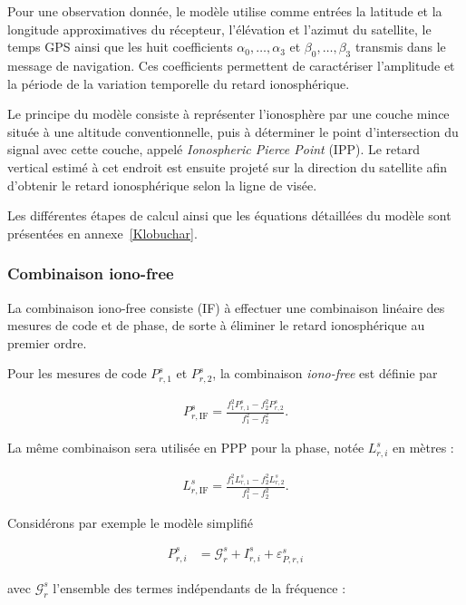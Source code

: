 Pour une observation donnée, le modèle utilise comme entrées la latitude et
la longitude approximatives du récepteur, l'élévation et l'azimut du
satellite, le temps GPS ainsi que les huit coefficients $\alpha_0,\ldots,
\alpha_3$ et $\beta_0,\ldots,\beta_3$ transmis dans le message de navigation.
Ces coefficients permettent de caractériser l'amplitude et la période de la
variation temporelle du retard ionosphérique. 

Le principe du modèle consiste à représenter l'ionosphère par une couche
mince située à une altitude conventionnelle, puis à déterminer le point
d'intersection du signal avec cette couche, appelé \textit{Ionospheric
Pierce Point} (IPP). Le retard vertical estimé à cet endroit est ensuite
projeté sur la direction du satellite afin d'obtenir le retard
ionosphérique selon la ligne de visée.

Les différentes étapes de calcul ainsi que les équations détaillées du
modèle sont présentées en annexe~\ref{Klobuchar}.

\subsubsection{Combinaison iono-free}

La combinaison iono-free consiste (IF) à effectuer une combinaison linéaire des mesures de code et de phase, de
sorte à éliminer le retard
ionosphérique au premier ordre. 

Pour les mesures de code $P_{r,1}^s$ et $P_{r,2}^s$, la combinaison
\textit{iono-free} est définie par

\begin{align}
P_{r,\mathrm{IF}}^s
=
\frac{
f_1^2P_{r,1}^s-f_2^2P_{r,2}^s
}{
f_1^2-f_2^2
}.
\label{eq:code_iono_free}
\end{align}

La même combinaison sera utilisée en PPP pour la phase,
notée $L_{r,i}^s$ en mètres :

\begin{align}
L_{r,\mathrm{IF}}^s
=
\frac{
f_1^2L_{r,1}^s-f_2^2L_{r,2}^s
}{
f_1^2-f_2^2
}.
\label{eq:phase_iono_free}
\end{align}

Considérons par exemple le modèle simplifié

\begin{align}
P_{r,i}^s
&=
\mathcal G_r^s
+
I_{r,i}^s
+
\varepsilon_{P,r,i}^s
\end{align}

avec $\mathcal G_r^s$ l'ensemble des termes indépendants de la fréquence :


